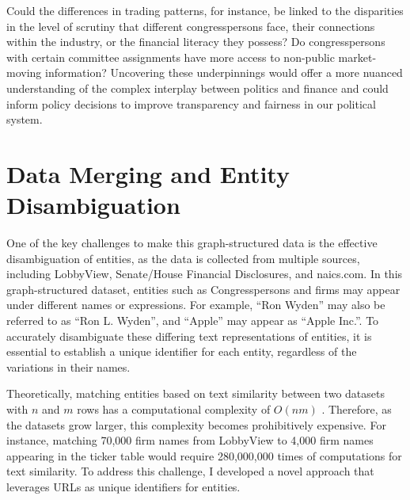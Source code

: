 \documentclass[15pt,letterpaper]{article}
\begin{document}
Could the differences in trading patterns, for instance, be linked to the disparities in the level of scrutiny that different congresspersons face, their connections within the industry, or the financial literacy they possess? Do congresspersons with certain committee assignments have more access to non-public market-moving information? Uncovering these underpinnings would offer a more nuanced understanding of the complex interplay between politics and finance and could inform policy decisions to improve transparency and fairness in our political system.





\appendix
\section{Data Merging and Entity Disambiguation}\label{app:disambiguation}

One of the key challenges to make this graph-structured data is the effective disambiguation of entities, as the data is collected from multiple sources, including LobbyView, Senate/House Financial Disclosures, and naics.com. In this graph-structured dataset, entities such as Congresspersons and firms may appear under different names or expressions. For example, ``Ron Wyden'' may also be referred to as ``Ron L. Wyden'', and ``Apple'' may appear as ``Apple Inc.''. To accurately disambiguate these differing text representations of entities, it is essential to establish a unique identifier for each entity, regardless of the variations in their names.

Theoretically, matching entities based on text similarity between two datasets with $n$ and $m$ rows has a computational complexity of 
$O(n m)$ \citep{onm}. 
Therefore, as the datasets grow larger, this complexity becomes prohibitively expensive. For instance, matching 70,000 firm names from LobbyView to 4,000 firm names appearing in the ticker table would require 280,000,000 times of computations for text similarity. To address this challenge, I developed a novel approach that leverages URLs as unique identifiers for entities.
\end{document}
